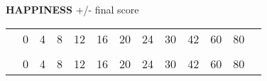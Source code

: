 \begin{flushleft}
  \textbf{HAPPINESS} \textcolor{supplemental}{+/- final score}
\end{flushleft}
\begin{tabular}{ccccccccccccc}
\hhline{~----------}
\multicolumn{1}{l|}{\textbf{:)}} &
  \multicolumn{1}{l|}{\cellcolor{happiness}0} &
  \multicolumn{1}{l|}{\cellcolor{happiness}4} &
  \multicolumn{1}{l|}{\cellcolor{happiness}8} &
  \multicolumn{1}{l|}{\cellcolor{happiness}12} &
  \multicolumn{1}{l|}{\cellcolor{happiness}16} &
  \multicolumn{1}{l|}{\cellcolor{happiness}20} &
  \multicolumn{1}{l|}{\cellcolor{happiness}24} &
  \multicolumn{1}{l|}{\cellcolor{happiness}30} &
  \multicolumn{1}{l|}{\cellcolor{happiness}42} &
  \multicolumn{1}{l|}{\cellcolor{happiness}60} &
  80 \\ \cline{2-11}
 &
   &
   &
   &
   &
   &
   &
   &
   &
   &
   &
   \\ \hhline{~----------}
\multicolumn{1}{l|}{\textbf{:(}} &
  \multicolumn{1}{l|}{\cellcolor{unhappiness}0} &
  \multicolumn{1}{l|}{\cellcolor{unhappiness}4} &
  \multicolumn{1}{l|}{\cellcolor{unhappiness}8} &
  \multicolumn{1}{l|}{\cellcolor{unhappiness}12} &
  \multicolumn{1}{l|}{\cellcolor{unhappiness}16} &
  \multicolumn{1}{l|}{\cellcolor{unhappiness}20} &
  \multicolumn{1}{l|}{\cellcolor{unhappiness}24} &
  \multicolumn{1}{l|}{\cellcolor{unhappiness}30} &
  \multicolumn{1}{l|}{\cellcolor{unhappiness}42} &
  \multicolumn{1}{l|}{\cellcolor{unhappiness}60} &
  80 \\ \cline{2-11}
\end{tabular}
